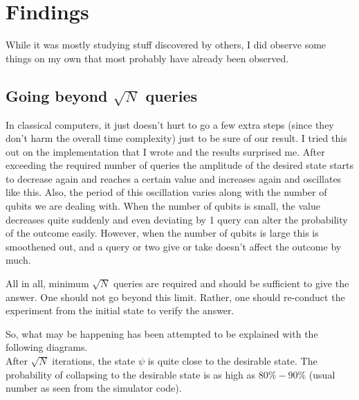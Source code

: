 \documentclass[a4paper]{article}
\begin{document}
\section{Findings}
While it was mostly studying stuff discovered by others, I did observe some things on my own that most probably have already been observed.

\subsection{Going beyond $\sqrt{N}$ queries}

In classical computers, it just doesn't hurt to go a few extra steps (since they don't harm the overall time complexity) just to be sure of our result.
I tried this out on the implementation that I wrote and the results surprised me. After exceeding the required number of queries the amplitude of the desired state starts to decrease again and reaches a certain value and increases again and oscillates like this. Also, the period of this oscillation varies along with the number of qubits we are dealing with. When the number of qubits is small, the value decreases quite suddenly and even deviating by 1 query can alter the probability of the outcome easily. However, when the number of qubits is large this is smoothened out, and a query or two give or take doesn't affect the outcome by much.

All in all, minimum $\sqrt{N}$ queries are required and should be sufficient to give the answer. One should not go beyond this limit. Rather, one should re-conduct the experiment from the initial state to verify the answer.

So, what may be happening has been attempted to be explained with the following diagrams.\\
After $\sqrt{N}$ iterations, the state $\psi$ is quite close to the desirable state. The probability of collapsing to the desirable state is as high as $80\% - 90\%$ (usual number as seen from the simulator code).

\end{document}
